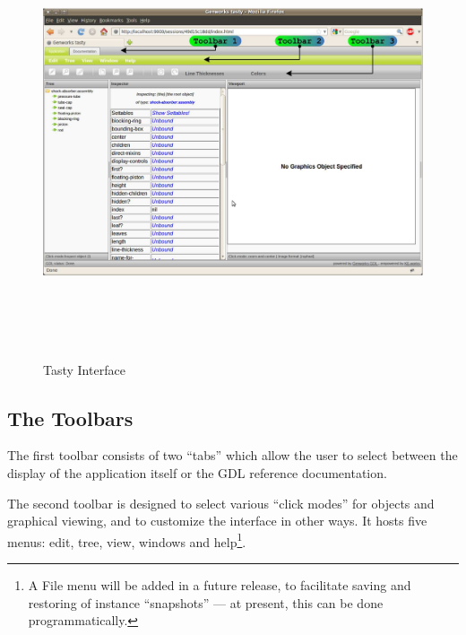 \documentclass [11pt]{book}
\begin{document}
\begin{figure}
\begin{center}
\includegraphics[width=5in,height=5in]{../images/tasty-shock-absorber-pre.pdf}
\end{center}

\caption{Tasty Interface}

\label{fig:tastyshockabsorberpre}

\end{figure}


\subsection{The Toolbars}

\label{subsec:thetoolbars}



The first toolbar consists of two ``tabs'' which allow the
user to select between the display of the application itself or the
GDL reference documentation.



The second toolbar is designed to select various ``click modes'' for
objects and graphical viewing, and to customize the interface in other
ways. It hosts five menus: edit, tree, view, windows and
help\footnote{A File menu will be added in a future release, to
facilitate saving and restoring of instance ``snapshots'' --- at
present, this can be done programmatically.}.
\end{document}
